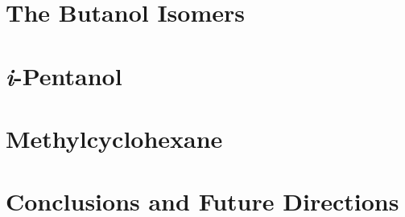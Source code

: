 \documentclass[12pt,letterpaper,oneside,draft]{book}
\begin{document}
\chapter{The Butanol Isomers}
\label{chap:buoh}

\cleardoublepage

\chapter{\textit{i}-Pentanol}
\label{chap:peoh}

\cleardoublepage

\chapter{Methylcyclohexane}
\label{chap:mch}

\cleardoublepage

\chapter{Conclusions and Future Directions}
\label{chap:conclusions}

\cleardoublepage

\printbibliography[heading=bibintoc]
\end{document}
